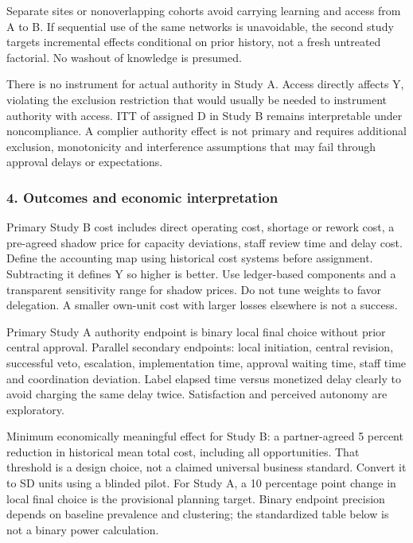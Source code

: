 \documentclass[
  11pt,
]{article}
\begin{document}
Separate sites or nonoverlapping cohorts avoid carrying learning and
access from A to B. If sequential use of the same networks is
unavoidable, the second study targets incremental effects conditional on
prior history, not a fresh untreated factorial. No washout of knowledge
is presumed.

There is no instrument for actual authority in Study A. Access directly
affects Y, violating the exclusion restriction that would usually be
needed to instrument authority with access. ITT of assigned D in Study B
remains interpretable under noncompliance. A complier authority effect
is not primary and requires additional exclusion, monotonicity and
interference assumptions that may fail through approval delays or
expectations.

\subsubsection{4. Outcomes and economic
interpretation}\label{outcomes-and-economic-interpretation}

Primary Study B cost includes direct operating cost, shortage or rework
cost, a pre-agreed shadow price for capacity deviations, staff review
time and delay cost. Define the accounting map using historical cost
systems before assignment. Subtracting it defines Y so higher is better.
Use ledger-based components and a transparent sensitivity range for
shadow prices. Do not tune weights to favor delegation. A smaller
own-unit cost with larger losses elsewhere is not a success.

Primary Study A authority endpoint is binary local final choice without
prior central approval. Parallel secondary endpoints: local initiation,
central revision, successful veto, escalation, implementation time,
approval waiting time, staff time and coordination deviation. Label
elapsed time versus monetized delay clearly to avoid charging the same
delay twice. Satisfaction and perceived autonomy are exploratory.

Minimum economically meaningful effect for Study B: a partner-agreed 5
percent reduction in historical mean total cost, including all
opportunities. That threshold is a design choice, not a claimed
universal business standard. Convert it to SD units using a blinded
pilot. For Study A, a 10 percentage point change in local final choice
is the provisional planning target. Binary endpoint precision depends on
baseline prevalence and clustering; the standardized table below is not
a binary power calculation.
\end{document}
